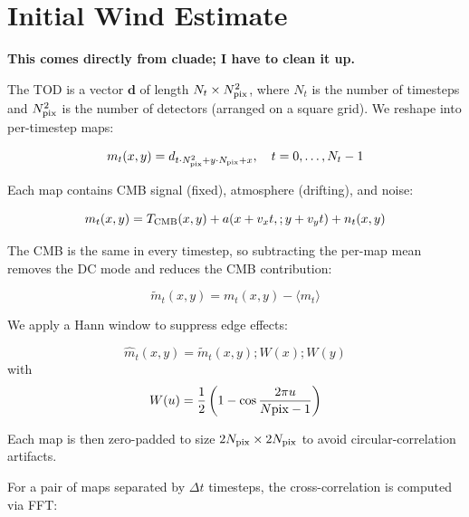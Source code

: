 \section{Initial Wind Estimate}

{\bf This comes directly from cluade; I have to clean it up.}

The TOD is a vector $\mathbf{d}$ of length $N_t \times N_{\rm pix}^2$, where $N_t$ is the number of
  timesteps and $N_{\rm pix}^2$ is the number of detectors (arranged on a square grid). We reshape into  
  per-timestep maps:                                           
                                                                                                         
  $$m_t(x,y) = d_{t \cdot N_{\rm pix}^2 + y \cdot N_{\rm pix} + x}, \quad t = 0, \ldots, N_t - 1$$       
  
  Each map contains CMB signal (fixed), atmosphere (drifting), and noise:                                
                                                               
  $$m_t(x,y) = T_{\rm CMB}(x,y) + a(x + v_x t,; y + v_y t) + n_t(x,y)$$                                  
                                                               
  The CMB is the same in every timestep, so subtracting the per-map mean removes the DC mode and reduces 
  the CMB contribution:                                        
                                                                                                         
  $$\tilde{m}_t(x,y) = m_t(x,y) - \langle m_t \rangle$$                                                  
  
  We apply a Hann window to suppress edge effects:                                                       
                                                               
  $$\hat{m}_t(x,y) = \tilde{m}_t(x,y) ; W(x) ; W(y)$$
  with
  $$  W(u) = \frac{1}{2}\left(1 - \cos\frac{2\pi     
  u}{N{\rm pix}-1}\right)$$
                                                                                                         
  Each map is then zero-padded to size $2N_{\rm pix} \times 2N_{\rm pix}$ to avoid circular-correlation  
  artifacts.
                                                                                                         
  For a pair of maps separated by $\Delta t$ timesteps, the cross-correlation is computed via FFT:       
  

